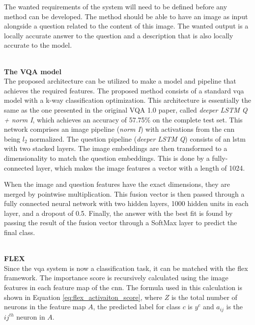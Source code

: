         
        
        
        The wanted requirements of the system will need to be defined before any method can be developed. 
        The method should be able to have an image as input alongside a question related to the content of this image. The wanted output is a locally accurate answer to the question and a description that is also locally accurate to the model. 
        
        \textbf{\\The VQA model\\} 
        The proposed architecture can be utilized to make a model and pipeline that achieves the required features. The proposed method consists of a standard \gls{vqa} model with a k-way classification optimization. This architecture is essentially the same as the one presented in the original VQA 1.0 paper, called \textit{deeper LSTM Q + norm I}, which achieves an accuracy of 57.75\% on the complete test set. 
        This network comprises an image pipeline (\textit{norm I}) with activations from the \gls{cnn} being $l_2$ normalized. The question pipeline (\textit{deeper LSTM Q}) consists of an \gls{lstm} with two stacked layers. 
        The image embeddings are then transformed to a dimensionality to match the question embeddings. This is done by a fully-connected layer, which makes the image features a vector with a length of 1024.

        When the image and question features have the exact dimensions, they are merged by pointwise multiplication. 
        This fusion vector is then passed through a fully connected neural network with two hidden layers, 1000 hidden units in each layer, and a dropout of 0.5.
        Finally, the answer with the best fit is found by passing the result of the  fusion vector through a SoftMax layer to predict the final class.
        
        
        
        
        

        \textbf{\\FLEX\\}
        Since the \gls{vqa} system is now a classification task, it can be matched with the \gls{flex} framework. 
        The importance score is recursively calculated using the image features in each feature map of the \gls{cnn}. The formula used in this calculation is shown in Equation \ref{eq:flex_activaiton_score}, where $Z$ is the total number of neurons in the feature map $A$, the predicted label for class $c$ is $y^c$ and $a_{ij}$ is the $ij^{th}$ neuron in $A$.


